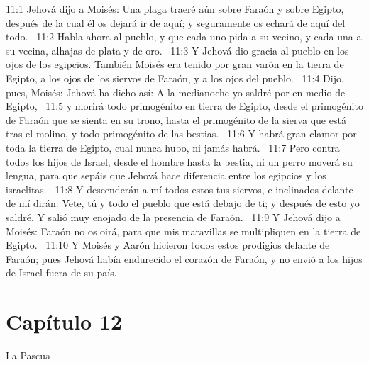 11:1 Jehová dijo a Moisés: Una plaga traeré aún sobre Faraón y sobre Egipto, después de la cual él os dejará ir de aquí; y seguramente os echará de aquí del todo.  
11:2 Habla ahora al pueblo, y que cada uno pida a su vecino, y cada una a su vecina, alhajas de plata y de oro.  
11:3 Y Jehová dio gracia al pueblo en los ojos de los egipcios. También Moisés era tenido por gran varón en la tierra de Egipto, a los ojos de los siervos de Faraón, y a los ojos del pueblo.  
11:4 Dijo, pues, Moisés: Jehová ha dicho así: A la medianoche yo saldré por en medio de Egipto,  
11:5 y morirá todo primogénito en tierra de Egipto, desde el primogénito de Faraón que se sienta en su trono, hasta el primogénito de la sierva que está tras el molino, y todo primogénito de las bestias.  
11:6 Y habrá gran clamor por toda la tierra de Egipto, cual nunca hubo, ni jamás habrá.  
11:7 Pero contra todos los hijos de Israel, desde el hombre hasta la bestia, ni un perro moverá su lengua, para que sepáis que Jehová hace diferencia entre los egipcios y los israelitas.  
11:8 Y descenderán a mí todos estos tus siervos, e inclinados delante de mí dirán: Vete, tú y todo el pueblo que está debajo de ti; y después de esto yo saldré. Y salió muy enojado de la presencia de Faraón.  
11:9 Y Jehová dijo a Moisés: Faraón no os oirá, para que mis maravillas se multipliquen en la tierra de Egipto.  
11:10 Y Moisés y Aarón hicieron todos estos prodigios delante de Faraón; pues Jehová había endurecido el corazón de Faraón, y no envió a los hijos de Israel fuera de su país.  
\section*{Capítulo 12}
La Pascua  

